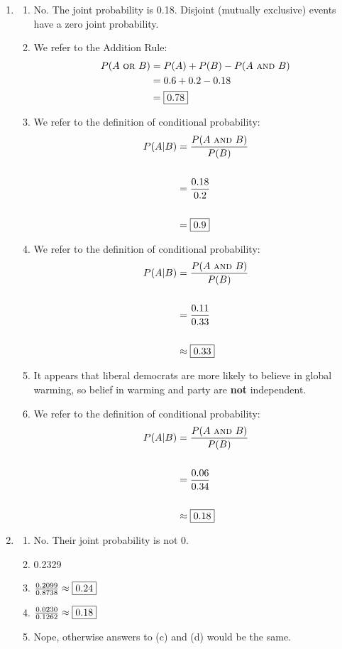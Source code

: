 \documentclass[12pt,letterpaper]{article}
\begin{document}
\begin{enumerate}
\newpage
\item \begin{enumerate}
	\item No. The joint probability is 0.18. Disjoint (mutually exclusive) events have a zero joint probability.
	\item We refer to the Addition Rule:
	\begin{align*}
	P(A~\textsc{or}~ B) &= P(A) + P(B) - P(A~\textsc{and}~ B) \\
	&= 0.6 + 0.2 - 0.18 \\
	&= \fbox{0.78} \\
	\end{align*}
	\item We refer to the definition of conditional probability:
	\begin{align*}
	P(A | B) &= \frac{P(A~\textsc{and}~ B)}{P(B)}  \\\\
	&= \frac{0.18}{0.2} \\\\
	&= \fbox{0.9} \\
	\end{align*}
	\item We refer to the definition of conditional probability:
	\begin{align*}
	P(A | B) &= \frac{P(A~\textsc{and}~ B)}{P(B)}  \\\\
	&= \frac{0.11}{0.33} \\\\
	&\approx \fbox{0.33} \\
	\end{align*}
	\item It appears that liberal democrats are more likely to believe in global warming, so belief in warming and party are {\bf not} independent.
	\item We refer to the definition of conditional probability:
	\begin{align*}
	P(A | B) &= \frac{P(A~\textsc{and}~ B)}{P(B)}  \\\\
	&= \frac{0.06}{0.34} \\\\
	&\approx \fbox{0.18} \\
	\end{align*}
\end{enumerate}

\newpage
\item \begin{enumerate}
	\item No. Their joint probability is not 0.
	\item 0.2329
	\item $\frac{0.2099}{0.8738} \approx \fbox{0.24} $
	\item $\frac{0.0230}{0.1262} \approx \fbox{0.18} $
	\item Nope, otherwise answers to (c) and (d) would be the same.
\end{enumerate}


\end{enumerate}
\end{document}
